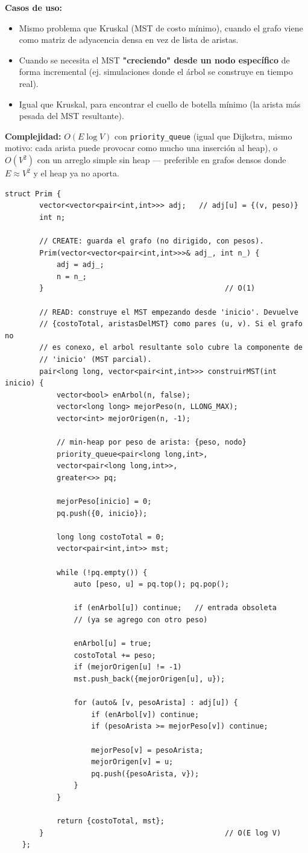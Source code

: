 \documentclass[10pt,a4paper,twocolumn]{article}
\begin{document}
\textbf{Casos de uso:}

\begin{itemize}
	\item Mismo problema que Kruskal (MST de costo mínimo), cuando el
	grafo viene como matriz de adyacencia densa en vez de lista de
	aristas.
	\item Cuando se necesita el MST \textbf{"creciendo" desde un nodo
		específico} de forma incremental (ej. simulaciones donde el árbol
	se construye en tiempo real).
	\item Igual que Kruskal, para encontrar el cuello de botella
	mínimo (la arista más pesada del MST resultante).
\end{itemize}

\textbf{Complejidad:} $O(E \log V)$ con \texttt{priority\_queue}
(igual que Dijkstra, mismo motivo: cada arista puede provocar como
mucho una inserción al heap), o $O(V^2)$ con un arreglo simple sin
heap — preferible en grafos densos donde $E \approx V^2$ y el heap ya
no aporta.

\begin{lstlisting}[style=cpp]
	struct Prim {
		vector<vector<pair<int,int>>> adj;   // adj[u] = {(v, peso)}
		int n;
		
		// CREATE: guarda el grafo (no dirigido, con pesos).
		Prim(vector<vector<pair<int,int>>>& adj_, int n_) {
			adj = adj_;
			n = n_;
		}                                          // O(1)
		
		// READ: construye el MST empezando desde 'inicio'. Devuelve
		// {costoTotal, aristasDelMST} como pares (u, v). Si el grafo no
		// es conexo, el arbol resultante solo cubre la componente de
		// 'inicio' (MST parcial).
		pair<long long, vector<pair<int,int>>> construirMST(int inicio) {
			vector<bool> enArbol(n, false);
			vector<long long> mejorPeso(n, LLONG_MAX);
			vector<int> mejorOrigen(n, -1);
			
			// min-heap por peso de arista: {peso, nodo}
			priority_queue<pair<long long,int>,
			vector<pair<long long,int>>,
			greater<>> pq;
			
			mejorPeso[inicio] = 0;
			pq.push({0, inicio});
			
			long long costoTotal = 0;
			vector<pair<int,int>> mst;
			
			while (!pq.empty()) {
				auto [peso, u] = pq.top(); pq.pop();
				
				if (enArbol[u]) continue;   // entrada obsoleta
				// (ya se agrego con otro peso)
				
				enArbol[u] = true;
				costoTotal += peso;
				if (mejorOrigen[u] != -1)
				mst.push_back({mejorOrigen[u], u});
				
				for (auto& [v, pesoArista] : adj[u]) {
					if (enArbol[v]) continue;
					if (pesoArista >= mejorPeso[v]) continue;
					
					mejorPeso[v] = pesoArista;
					mejorOrigen[v] = u;
					pq.push({pesoArista, v});
				}
			}
			
			return {costoTotal, mst};
		}                                          // O(E log V)
	};
\end{lstlisting}
\end{document}
